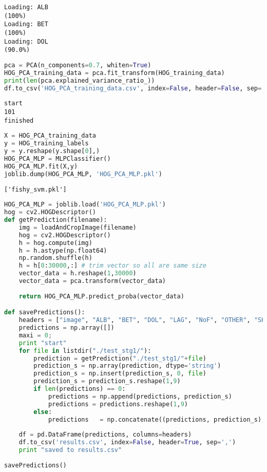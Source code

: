 \begin{lstlisting}
Loading: ALB
(100%)                                      
Loading: BET
(100%)                                      
Loading: DOL
(90.0%)                                   
\end{lstlisting}

\begin{lstlisting}[language=Python]
pca = PCA(n_components=0.7, whiten=True)
HOG_PCA_training_data = pca.fit_transform(HOG_training_data)
print(len(pca.explained_variance_ratio_)) 
df.to_csv('HOG_PCA_training_data.csv', index=False, header=False, sep=',')
\end{lstlisting}

\begin{lstlisting}
start
101
finished
\end{lstlisting}

\begin{lstlisting}[language=Python]
X = HOG_PCA_training_data
y = HOG_training_labels
y = y.reshape(y.shape[0],)
HOG_PCA_MLP = MLPClassifier()
HOG_PCA_MLP.fit(X,y)
joblib.dump(HOG_PCA_MLP, 'HOG_PCA_MLP.pkl')
\end{lstlisting}

\begin{lstlisting}
['fishy_svm.pkl']
\end{lstlisting}

\begin{lstlisting}[language=Python]
HOG_PCA_MLP = joblib.load('HOG_PCA_MLP.pkl')
hog = cv2.HOGDescriptor()
def getPrediction(filename):
    img = loadAndCropImage(filename)
    hog = cv2.HOGDescriptor()
    h = hog.compute(img)
    h = h.astype(np.float64)
    np.random.shuffle(h)
    h = h[0:30000,:] # trim vector so all are same size
    vector_data = h.reshape(1,30000) 
    vector_data = pca.transform(vector_data)
    
    return HOG_PCA_MLP.predict_proba(vector_data)

def savePredictions():
    headers = ["image", "ALB", "BET", "DOL", "LAG", "NoF", "OTHER", "SHARK", "YFT"]
    predictions = np.array([])
    maxi = 0;
    print "start"
    for file in listdir("./test_stg1/"):
        prediction = getPrediction("./test_stg1/"+file)
        prediction_s = np.array(prediction, dtype='string')
        prediction_s = np.insert(prediction_s, 0, file)
        prediction_s = prediction_s.reshape(1,9)
        if len(predictions) == 0:
            predictions = np.append(predictions, prediction_s)
            predictions = predictions.reshape(1,9)
        else:
            predictions   = np.concatenate((predictions, prediction_s), axis=0)
    
    df = pd.DataFrame(predictions, columns=headers)
    df.to_csv('results.csv', index=False, header=True, sep=',')
    print "saved to results.csv"
    
savePredictions()
        
\end{lstlisting}

